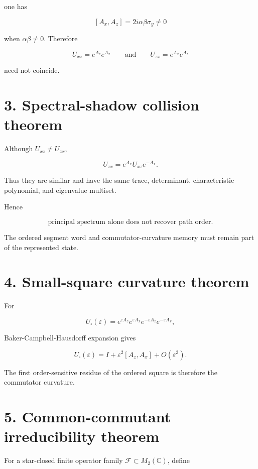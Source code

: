 one has

\[
[A_x,A_z]=2i\alpha\beta\sigma_y\neq0
\]

when \(\alpha\beta\neq0\). Therefore

\[
U_{xz}=e^{A_z}e^{A_x}
\qquad\text{and}\qquad
U_{zx}=e^{A_x}e^{A_z}
\]

need not coincide.

\hypertarget{spectral-shadow-collision-theorem}{%
\section{3. Spectral-shadow collision theorem}\label{spectral-shadow-collision-theorem}}

Although \(U_{xz}\neq U_{zx}\),

\[
U_{zx}=e^{A_x}U_{xz}e^{-A_x}.
\]

Thus they are similar and have the same trace, determinant, characteristic polynomial, and eigenvalue multiset.

Hence

\[
\boxed{\text{principal spectrum alone does not recover path order}.}
\]

The ordered segment word and commutator-curvature memory must remain part of the represented state.

\hypertarget{small-square-curvature-theorem}{%
\section{4. Small-square curvature theorem}\label{small-square-curvature-theorem}}

For

\[
U_\square(\varepsilon)
=e^{\varepsilon A_z}e^{\varepsilon A_x}
 e^{-\varepsilon A_z}e^{-\varepsilon A_x},
\]

Baker-Campbell-Hausdorff expansion gives

\[
\boxed{
U_\square(\varepsilon)
=I+\varepsilon^2[A_z,A_x]+O(\varepsilon^3).
}
\]

The first order-sensitive residue of the ordered square is therefore the commutator curvature.

\hypertarget{common-commutant-irreducibility-theorem}{%
\section{5. Common-commutant irreducibility theorem}\label{common-commutant-irreducibility-theorem}}

For a star-closed finite operator family \(\mathcal F\subset M_2(\mathbb C)\), define

